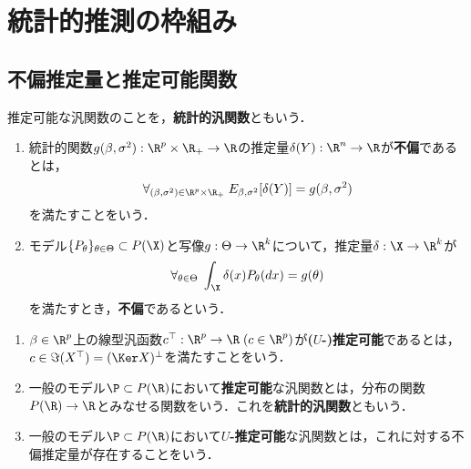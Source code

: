 \documentclass[uplatex,dvipdfmx]{jsreport}
\begin{document}
\section{統計的推測の枠組み}

\subsection{不偏推定量と推定可能関数}

\begin{tcolorbox}[colframe=ForestGreen, colback=ForestGreen!10!white,breakable,colbacktitle=ForestGreen!40!white,coltitle=black,fonttitle=\bfseries\sffamily,
    title=]
    推定可能な汎関数のことを，\textbf{統計的汎関数}ともいう．
\end{tcolorbox}

\begin{definition}\mbox{}
    \begin{enumerate}
        \item 統計的関数$g(\beta,\sigma^2):\R^p\times\R_+\to\R$の推定量$\delta(Y):\R^n\to\R$が\textbf{不偏}であるとは，
        \[\forall_{(\beta,\sigma^2)\in\R^p\times\R_+}\;E_{\beta,\sigma^2}[\delta(Y)]=g(\beta,\sigma^2)\]
        を満たすことをいう．
        \item モデル$\{P_\theta\}_{\theta\in\Theta}\subset P(\X)$と写像$g:\Theta\to\R^k$について，推定量$\delta:\X\to\R^k$が
        \[\forall_{\theta\in\Theta}\;\int_\X\delta(x)P_\theta(dx)=g(\theta)\]
        を満たすとき，\textbf{不偏}であるという．
    \end{enumerate}
\end{definition}

\begin{definition}\mbox{}
    \begin{enumerate}
        \item $\beta\in\R^p$上の線型汎函数$c^\top:\R^p\to\R\;(c\in\R^p)$が\textbf{($U$-)推定可能}であるとは，$c\in\Im(X^\top)=(\Ker X)^\perp$を満たすことをいう．
        \item 一般のモデル$\P\subset P(\R)$において\textbf{推定可能}な汎関数とは，分布の関数$P(\R)\to\R$とみなせる関数をいう．これを\textbf{統計的汎関数}ともいう．
        \item 一般のモデル$\P\subset P(\R)$において\textbf{$U$-推定可能}な汎関数とは，これに対する不偏推定量が存在することをいう．
    \end{enumerate}
\end{definition}
\end{document}
